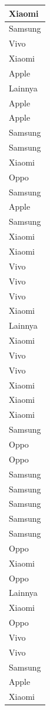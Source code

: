 \documentclass[
  letterpaper,
  DIV=11,
  numbers=noendperiod]{scrartcl}
\begin{document}
\begin{table}
\begin{tabular}[t]{l}
\hline
Xiaomi\\
\hline
Samsung\\
\hline
Vivo\\
\hline
Xiaomi\\
\hline
Apple\\
\hline
Lainnya\\
\hline
Apple\\
\hline
Apple\\
\hline
Samsung\\
\hline
Samsung\\
\hline
Xiaomi\\
\hline
Oppo\\
\hline
Samsung\\
\hline
Apple\\
\hline
Samsung\\
\hline
Xiaomi\\
\hline
Xiaomi\\
\hline
Vivo\\
\hline
Vivo\\
\hline
Vivo\\
\hline
Xiaomi\\
\hline
Lainnya\\
\hline
Xiaomi\\
\hline
Vivo\\
\hline
Vivo\\
\hline
Xiaomi\\
\hline
Xiaomi\\
\hline
Xiaomi\\
\hline
Samsung\\
\hline
Oppo\\
\hline
Oppo\\
\hline
Samsung\\
\hline
Samsung\\
\hline
Samsung\\
\hline
Samsung\\
\hline
Samsung\\
\hline
Oppo\\
\hline
Xiaomi\\
\hline
Oppo\\
\hline
Lainnya\\
\hline
Xiaomi\\
\hline
Oppo\\
\hline
Vivo\\
\hline
Vivo\\
\hline
Samsung\\
\hline
Apple\\
\hline
Xiaomi\\

\end{tabular}
\end{table}
\end{document}
